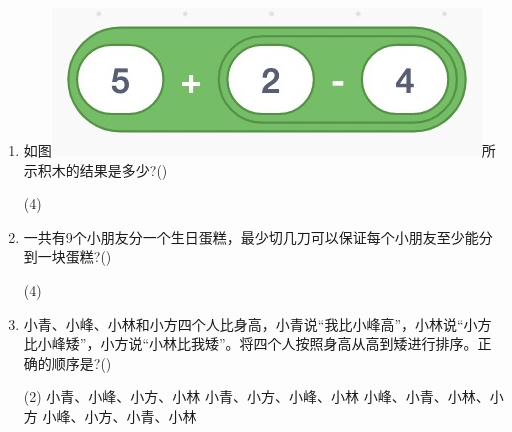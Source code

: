 \documentclass[10pt, a4paper]{article}
\begin{document}
\begin{enumerate}

        \item 如图\includegraphics[width=.15\textwidth]{22.jpg}所示积木的结果是多少?(\qquad)
        \begin{tasks}(4)
        \end{tasks}

        \newpage
        \item 一共有9个小朋友分一个生日蛋糕，最少切几刀可以保证每个小朋友至少能分到一块蛋糕?(\qquad)
        \begin{tasks}(4)
        \end{tasks}

        \item 小青、小峰、小林和小方四个人比身高，小青说“我比小峰高”，小林说“小方比小峰矮”，小方说“小林比我矮”。将四个人按照身高从高到矮进行排序。正确的顺序是?(\qquad)
        \begin{tasks}(2)
            \task 小青、小峰、小方、小林
            \task 小青、小方、小峰、小林
            \task 小峰、小青、小林、小方
            \task 小峰、小方、小青、小林
        \end{tasks}


\end{enumerate}
\end{document}
